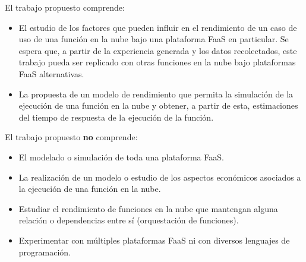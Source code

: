 El trabajo propuesto comprende:
\begin{itemize}
    \item El estudio de los factores que pueden influir en el rendimiento de un caso de uso de una función en la nube bajo una plataforma FaaS en particular. Se espera que, a partir de la experiencia generada y los datos recolectados, este trabajo pueda ser replicado con otras funciones en la nube bajo plataformas FaaS alternativas.
    \item La propuesta de un modelo de rendimiento que permita la simulación de la ejecución de una función en la nube y obtener, a partir de esta, estimaciones del tiempo de respuesta de la ejecución de la función.
\end{itemize}


El trabajo propuesto \textbf{no} comprende:
\begin{itemize}
    \item El modelado o simulación de toda una plataforma FaaS.
    \item La realización de un modelo o estudio de los aspectos económicos asociados a la ejecución de una función en la nube.
    \item Estudiar el rendimiento de funciones en la nube que mantengan alguna relación o dependencias entre sí (orquestación de funciones).
    \item Experimentar con múltiples plataformas FaaS ni con diversos lenguajes de programación.
    
\end{itemize}
